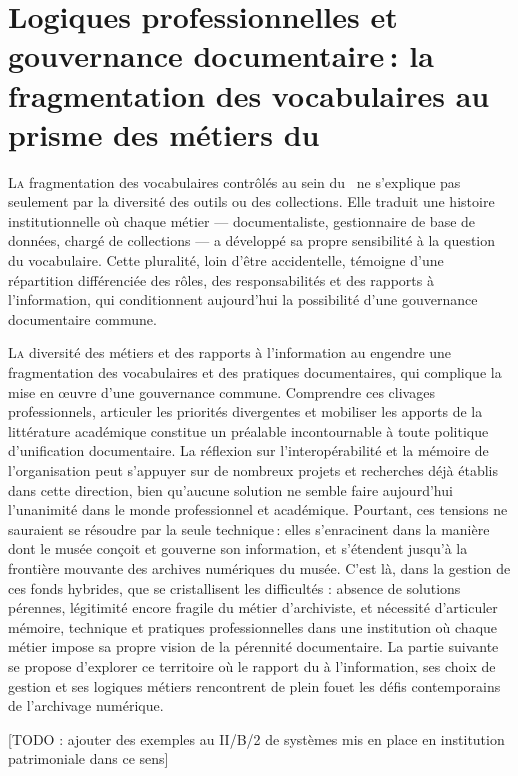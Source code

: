\chapter[Diversité des métiers et fragmentation documentaire]{\label{II-B}Logiques professionnelles et gouvernance documentaire : la fragmentation des vocabulaires au prisme des métiers du \mae}

\lettrine{L}a fragmentation des vocabulaires contrôlés au sein du \maelong~ne s'explique pas seulement par la diversité des outils ou des collections. Elle traduit une histoire institutionnelle où chaque métier — documentaliste, gestionnaire de base de données, chargé de collections — a développé sa propre sensibilité à la question du vocabulaire. Cette pluralité, loin d'être accidentelle, témoigne d'une répartition différenciée des rôles, des responsabilités et des rapports à l'information, qui conditionnent aujourd'hui la possibilité d'une gouvernance documentaire commune.




\bigskip
\bigskip
\bigskip

\lettrine{L}{a} diversité des métiers et des rapports à l'information au \mae engendre une fragmentation des vocabulaires et des pratiques documentaires, qui complique la mise en œuvre d'une gouvernance commune. Comprendre ces clivages professionnels, articuler les priorités divergentes et mobiliser les apports de la littérature académique constitue un préalable incontournable à toute politique d'unification documentaire. La réflexion sur l'interopérabilité et la mémoire de l'organisation peut s'appuyer sur de nombreux projets et recherches déjà établis dans cette direction, bien qu'aucune solution ne semble faire aujourd'hui l'unanimité dans le monde professionnel et académique. Pourtant, ces tensions ne sauraient se résoudre par la seule technique : elles s’enracinent dans la manière dont le musée conçoit et gouverne son information, et s’étendent jusqu’à la frontière mouvante des archives numériques du musée. C’est là, dans la gestion de ces fonds hybrides, que se cristallisent les difficultés : absence de solutions pérennes, légitimité encore fragile du métier d’archiviste, et nécessité d’articuler mémoire, technique et pratiques professionnelles dans une institution où chaque métier impose sa propre vision de la pérennité documentaire. La partie suivante se propose d’explorer ce territoire où le rapport du \mae à l’information, ses choix de gestion et ses logiques métiers rencontrent de plein fouet les défis contemporains de l’archivage numérique.

[TODO : ajouter des exemples au II/B/2 de systèmes mis en place en institution patrimoniale dans ce sens]